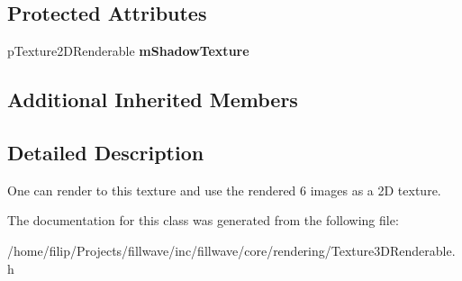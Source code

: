 \subsection*{Protected Attributes}
\begin{DoxyCompactItemize}
\item 
\hypertarget{classfillwave_1_1core_1_1Texture3DRenderable_aaab8fa4596976887d41a140b617837b3}{}p\+Texture2\+D\+Renderable {\bfseries m\+Shadow\+Texture}\label{classfillwave_1_1core_1_1Texture3DRenderable_aaab8fa4596976887d41a140b617837b3}

\end{DoxyCompactItemize}
\subsection*{Additional Inherited Members}


\subsection{Detailed Description}
One can render to this texture and use the rendered 6 images as a 2\+D texture. 

The documentation for this class was generated from the following file\+:\begin{DoxyCompactItemize}
\item 
/home/filip/\+Projects/fillwave/inc/fillwave/core/rendering/Texture3\+D\+Renderable.\+h\end{DoxyCompactItemize}
